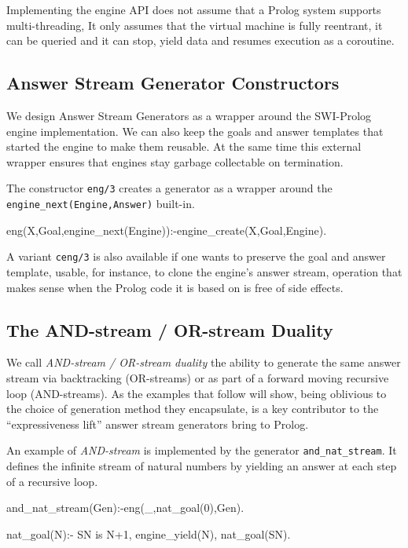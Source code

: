 \documentclass{new_tlp}
\begin{document}
Implementing the engine API does not assume that a Prolog system supports multi-threading, It only assumes that the virtual machine is fully reentrant, it can be queried and it can stop, yield data and resumes execution as a coroutine.

\begin{comment}
As Prolog virtual machines, engines have  an internal state. Thus interacting with them requires a concise and expressive, but ultimately procedural API. This is not very different from what working with attributed variables, instrumental to adding constraint solvers, requires.
\end{comment}

\subsection{Answer Stream Generator Constructors}

We design Answer Stream Generators as a wrapper around the SWI-Prolog engine implementation.
We can also keep the goals and answer templates that started the engine to make them reusable. At the same time this external wrapper ensures that engines stay garbage collectable on termination.

The constructor {\tt eng/3} creates a generator as a wrapper around
the {\tt engine\_next(Engine,Answer)} built-in.
\begin{code}
eng(X,Goal,engine_next(Engine)):-engine_create(X,Goal,Engine). 
\end{code}
A variant {\tt ceng/3} is also available if one wants to preserve
the goal and answer template, usable, for instance, to clone
the engine's answer stream, 
operation that makes sense when the Prolog code it is based on 
is free of side effects.

\subsection{The AND-stream / OR-stream Duality}

We call {\em AND-stream / OR-stream duality} the
ability to generate the same answer stream via backtracking (OR-streams) or
as part of a forward moving recursive loop (AND-streams).
As the examples that follow will show,
being oblivious to the choice of generation method they encapsulate,
is a key contributor to the ``expressiveness lift'' answer stream
generators bring to Prolog.

An example of {\em AND-stream} is  implemented
by the generator {\tt and\_nat\_stream}. 
It defines the infinite stream of natural numbers 
by yielding an answer at each step of a recursive loop.
\begin{code}
and_nat_stream(Gen):-eng(_,nat_goal(0),Gen).

nat_goal(N):-
  SN is N+1,
  engine_yield(N),
  nat_goal(SN).
\end{code}
\end{document}

